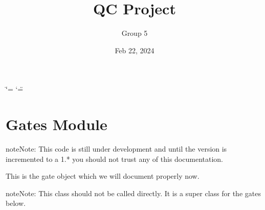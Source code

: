 \documentclass[letterpaper,10pt,english]{sphinxmanual}
\title{QC Project}
\date{Feb 22, 2024}
\author{Group 5}
\begin{document}
\ifdefined\shorthandoff
  \ifnum\catcode`\=\string=\active\shorthandoff{=}\fi
  \ifnum\catcode`\"=\active{}\fi
\fi

\pagestyle{empty}
\sphinxmaketitle
\pagestyle{plain}
\sphinxtableofcontents
\pagestyle{normal}
\label{\detokenize{index::doc}}


\chapter{Gates Module}
\label{\detokenize{index:gates-module}}\label{\detokenize{index:module-gates}}
\begin{sphinxadmonition}{note}{Note:}
\sphinxAtStartPar
This code is still under development and until the version 
is incremented to a 1.* you should not trust any of this 
documentation.
\end{sphinxadmonition}

\begin{fulllineitems}
\label{\detokenize{index:gates.Gate}}
\pysigstartsignatures
{}
\pysigstopsignatures
\sphinxAtStartPar
This is the gate object which we will document properly now.

\begin{sphinxadmonition}{note}{Note:}
\sphinxAtStartPar
This class should not be called directly. It is a super
class for the gates below.
\end{sphinxadmonition}

\end{fulllineitems}


\begin{fulllineitems}
\label{\detokenize{index:gates.H}}
\pysigstartsignatures
{}
\pysigstopsignatures
\end{fulllineitems}

\end{document}
